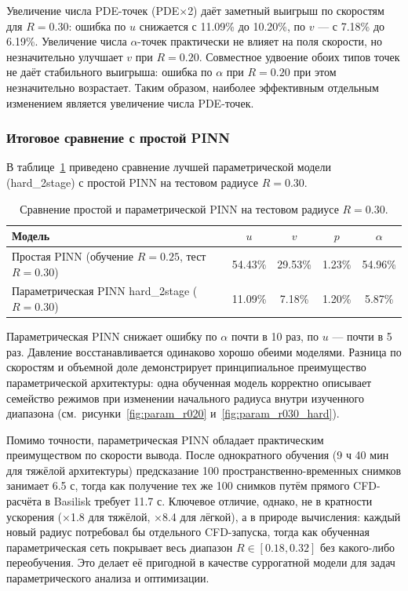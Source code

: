 \documentclass[12pt,a4paper]{article}
\begin{document}
Увеличение числа PDE-точек (PDE$\times$2) даёт заметный выигрыш по скоростям
для \(R=0.30\): ошибка по \(u\) снижается с 11.09\% до 10.20\%, по \(v\) ---
с 7.18\% до 6.19\%. Увеличение числа \(\alpha\)-точек практически не влияет на
поля скорости, но незначительно улучшает \(v\) при \(R=0.20\). Совместное
удвоение обоих типов точек не даёт стабильного выигрыша: ошибка по \(\alpha\)
при \(R=0.20\) при этом незначительно возрастает. Таким образом, наиболее
эффективным отдельным изменением является увеличение числа PDE-точек.

\subsubsection{Итоговое сравнение с простой PINN}

В таблице~\ref{tab:simple_vs_param} приведено сравнение лучшей параметрической
модели (hard\_2stage) с простой PINN на тестовом радиусе \(R=0.30\).

\begin{table}[H]
    \centering
    \begin{tabular}{l|cccc}
        \hline
        Модель & \(u\) & \(v\) & \(p\) & \(\alpha\) \\
        \hline
        Простая PINN (обучение \(R=0.25\), тест \(R=0.30\)) & 54.43\% & 29.53\% & 1.23\% & 54.96\% \\
        Параметрическая PINN hard\_2stage (\(R=0.30\))        & 11.09\% & 7.18\% & 1.20\% & 5.87\% \\
        \hline
    \end{tabular}
    \caption{Сравнение простой и параметрической PINN на тестовом радиусе \(R=0.30\).}
    \label{tab:simple_vs_param}
\end{table}

Параметрическая PINN снижает ошибку по \(\alpha\) почти в 10 раз, по \(u\) ---
почти в 5 раз. Давление восстанавливается одинаково хорошо обеими моделями.
Разница по скоростям и объемной доле демонстрирует принципиальное преимущество
параметрической архитектуры: одна обученная модель корректно описывает семейство
режимов при изменении начального радиуса внутри изученного диапазона
(см.~рисунки~\ref{fig:param_r020} и~\ref{fig:param_r030_hard}).

Помимо точности, параметрическая PINN обладает практическим преимуществом по
скорости вывода. После однократного обучения (9 ч 40 мин для тяжёлой архитектуры) предсказание
100 пространственно-временных снимков занимает 6.5 с, тогда как получение тех
же 100 снимков путём прямого CFD-расчёта в Basilisk требует 11.7 с. Ключевое
отличие, однако, не в кратности ускорения (×1.8 для тяжёлой, ×8.4 для лёгкой), а в
природе вычисления: каждый новый радиус потребовал бы отдельного CFD-запуска,
тогда как обученная параметрическая сеть покрывает весь диапазон
$R \in [0.18, 0.32]$ без какого-либо переобучения. Это делает её пригодной в
качестве суррогатной модели для задач параметрического анализа и оптимизации.
\end{document}
